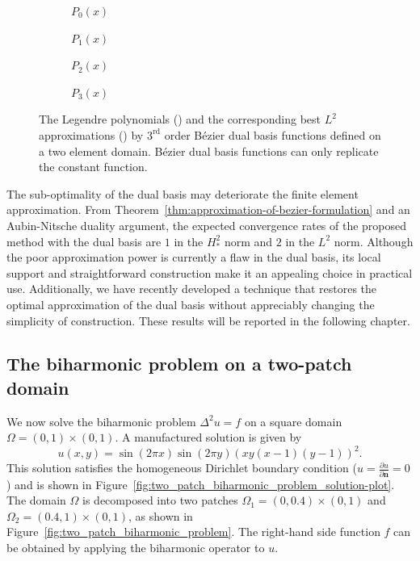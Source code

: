 \begin{figure}[ht]
	\captionsetup[subfigure]{labelformat=empty, font = footnotesize}
	\centering
	\begin{subfigure}[b]{0.47\textwidth}
		\centering
		
		\caption{$P_0(x)$}
	\end{subfigure}
	\begin{subfigure}[b]{0.47\textwidth}
		\centering
		
		\caption{$P_1(x)$}
	\end{subfigure}
	\begin{subfigure}[b]{0.47\textwidth}
		\centering
		
		\caption{$P_2(x)$}
	\end{subfigure}
	\begin{subfigure}[b]{0.47\textwidth}
		\centering
		
		\caption{$P_3(x)$}
	\end{subfigure}
	\caption{The Legendre polynomials (\protect\blueline) and the corresponding best $L^2$ approximations (\protect\redline) by $3^\text{rd}$ order B\'ezier dual basis functions defined on a two element domain. B\'ezier dual basis functions can only replicate the constant function.}
	\label{fig:polynomial_completeness}
\end{figure}
The sub-optimality of the \Bezier dual basis may deteriorate the finite element approximation. From Theorem~\ref{thm:approximation-of-bezier-formulation} and an Aubin-Nitsche duality argument, the expected convergence rates of the proposed method with the \Bezier dual basis are $1$ in the $H^2_*$ norm and $2$ in the $L^2$ norm. Although the poor approximation power is currently a flaw in the \Bezier dual basis, its local support and straightforward construction make it an appealing choice in practical use. Additionally, we have recently developed a technique that restores the optimal approximation of the \Bezier dual basis without appreciably changing the simplicity of construction. These results will be reported in the following chapter.


\subsection{The biharmonic problem on a two-patch domain}\label{sec:two_patch}

We now solve the biharmonic problem $\Delta^2{}u=f$ on a square domain $\Omega={(0,1)\times(0,1)}$. A manufactured solution is given by
\begin{equation}
	u(x,y)=\sin(2\pi{x})\sin(2\pi{y})(xy(x-1)(y-1))^2.
\end{equation}
This solution satisfies the homogeneous Dirichlet boundary condition ($u=\frac{\partial{u}}{\partial{\mathbf{n}}}=0$) and is shown in Figure~\ref{fig:two_patch_biharmonic_problem_solution-plot}. The domain $\Omega$ is decomposed into two patches $\Omega_1={(0,0.4)\times(0,1)}$ and $\Omega_2={(0.4,1)\times(0,1)}$, as shown in Figure~\ref{fig:two_patch_biharmonic_problem}. The right-hand side function $f$ can be obtained by applying the biharmonic operator to $u$.\par


